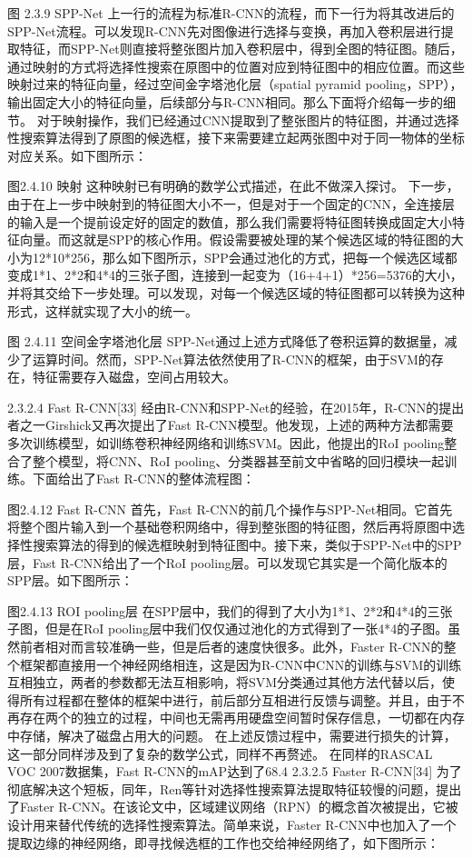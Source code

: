 图 2.3.9 SPP-Net
上一行的流程为标准R-CNN的流程，而下一行为将其改进后的SPP-Net流程。可以发现R-CNN先对图像进行选择与变换，再加入卷积层进行提取特征，而SPP-Net则直接将整张图片加入卷积层中，得到全图的特征图。随后，通过映射的方式将选择性搜索在原图中的位置对应到特征图中的相应位置。而这些映射过来的特征向量，经过空间金字塔池化层（spatial pyramid pooling，SPP），输出固定大小的特征向量，后续部分与R-CNN相同。那么下面将介绍每一步的细节。
对于映射操作，我们已经通过CNN提取到了整张图片的特征图，并通过选择性搜索算法得到了原图的候选框，接下来需要建立起两张图中对于同一物体的坐标对应关系。如下图所示：

图2.4.10 映射
这种映射已有明确的数学公式描述，在此不做深入探讨。
下一步，由于在上一步中映射到的特征图大小不一，但是对于一个固定的CNN，全连接层的输入是一个提前设定好的固定的数值，那么我们需要将特征图转换成固定大小特征向量。而这就是SPP的核心作用。假设需要被处理的某个候选区域的特征图的大小为12*10*256，那么如下图所示，SPP会通过池化的方式，把每一个候选区域都变成1*1、2*2和4*4的三张子图，连接到一起变为（16+4+1）*256=5376的大小，并将其交给下一步处理。可以发现，对每一个候选区域的特征图都可以转换为这种形式，这样就实现了大小的统一。

图 2.4.11 空间金字塔池化层
SPP-Net通过上述方式降低了卷积运算的数据量，减少了运算时间。然而，SPP-Net算法依然使用了R-CNN的框架，由于SVM的存在，特征需要存入磁盘，空间占用较大。

2.3.2.4 Fast R-CNN[33]
	经由R-CNN和SPP-Net的经验，在2015年，R-CNN的提出者之一Girshick又再次提出了Fast R-CNN模型。他发现，上述的两种方法都需要多次训练模型，如训练卷积神经网络和训练SVM。因此，他提出的RoI pooling整合了整个模型，将CNN、RoI pooling、分类器甚至前文中省略的回归模块一起训练。下面给出了Fast R-CNN的整体流程图：

图2.4.12 Fast R-CNN
首先，Fast R-CNN的前几个操作与SPP-Net相同。它首先将整个图片输入到一个基础卷积网络中，得到整张图的特征图，然后再将原图中选择性搜索算法的得到的候选框映射到特征图中。接下来，类似于SPP-Net中的SPP层，Fast R-CNN给出了一个RoI pooling层。可以发现它其实是一个简化版本的SPP层。如下图所示：

图2.4.13 ROI pooling层
在SPP层中，我们的得到了大小为1*1、2*2和4*4的三张子图，但是在RoI pooling层中我们仅仅通过池化的方式得到了一张4*4的子图。虽然前者相对而言较准确一些，但是后者的速度快很多。此外，Faster R-CNN的整个框架都直接用一个神经网络相连，这是因为R-CNN中CNN的训练与SVM的训练互相独立，两者的参数都无法互相影响，将SVM分类通过其他方法代替以后，使得所有过程都在整体的框架中进行，前后部分互相进行反馈与调整。并且，由于不再存在两个的独立的过程，中间也无需再用硬盘空间暂时保存信息，一切都在内存中存储，解决了磁盘占用大的问题。
在上述反馈过程中，需要进行损失的计算，这一部分同样涉及到了复杂的数学公式，同样不再赘述。
在同样的RASCAL VOC 2007数据集，Fast R-CNN的mAP达到了68.4%
2.3.2.5 Faster R-CNN[34]
为了彻底解决这个短板，同年，Ren等针对选择性搜索算法提取特征较慢的问题，提出了Faster R-CNN。在该论文中，区域建议网络（RPN）的概念首次被提出，它被设计用来替代传统的选择性搜索算法。简单来说，Faster R-CNN中也加入了一个提取边缘的神经网络，即寻找候选框的工作也交给神经网络了，如下图所示：

